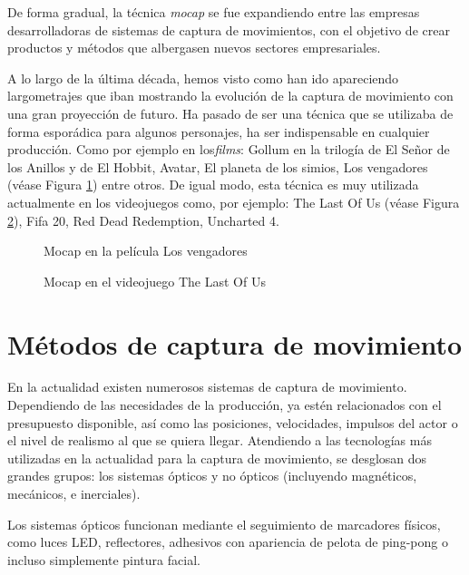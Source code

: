 De forma gradual, la técnica \textit{mocap} se fue expandiendo entre las empresas desarrolladoras de sistemas de captura de movimientos, con el objetivo de crear productos y métodos que albergasen nuevos sectores empresariales. 

A lo largo de la última década, hemos visto como han ido apareciendo largometrajes que iban mostrando la evolución de la captura de movimiento con una gran proyección de futuro. Ha pasado de ser una técnica que se utilizaba de forma esporádica para algunos personajes, ha ser indispensable en cualquier producción. Como por ejemplo en los\textit{films}: Gollum en la trilogía de El Señor de los Anillos y de El Hobbit, Avatar, El planeta de los simios, Los vengadores (véase Figura \ref{fig:Thanos}) entre otros. De igual modo, esta técnica es muy utilizada actualmente en los videojuegos como, por ejemplo: The Last Of Us (véase Figura \ref{fig:TheLastOfUs}), Fifa 20, Red Dead Redemption, Uncharted 4.

\begin{figure}[h!]
    \centering
    \caption{Mocap en la película Los vengadores}
    \label{fig:Thanos}  
\end{figure}

\begin{figure}[h!]
    \centering
    \caption{Mocap en el videojuego The Last Of Us}
    \label{fig:TheLastOfUs}  
\end{figure}


\section{Métodos de captura de movimiento}

En la actualidad existen numerosos sistemas de captura de movimiento. Dependiendo de las necesidades de la producción, ya estén relacionados con el presupuesto disponible, así como las posiciones, velocidades, impulsos del actor o el nivel de realismo al que se quiera llegar. Atendiendo a las tecnologías más utilizadas en la actualidad para la captura de movimiento, se desglosan dos grandes grupos: los sistemas ópticos y no ópticos (incluyendo magnéticos, mecánicos, e inerciales).

Los sistemas ópticos funcionan mediante el seguimiento de marcadores físicos, como luces LED, reflectores, adhesivos con apariencia de pelota de ping-pong o incluso simplemente pintura facial.

